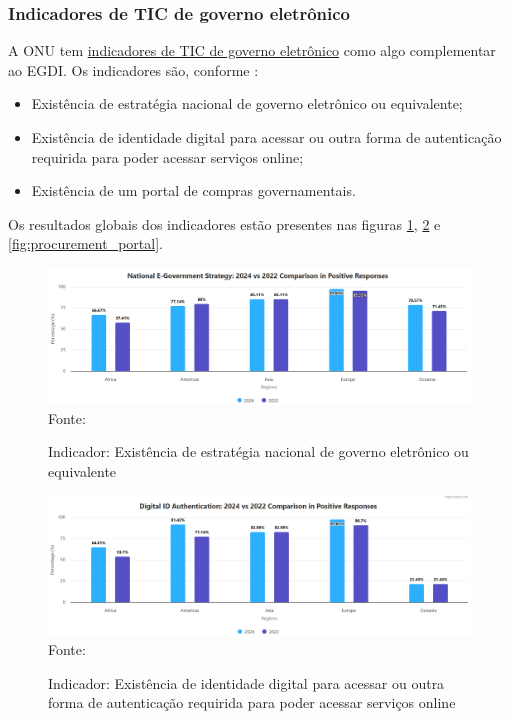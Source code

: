 \subsubsection{Indicadores de TIC de governo eletrônico}

A ONU tem \href{https://publicadministration.un.org/egovkb/en-us/Data/ICT-in-government}{indicadores de TIC de governo eletrônico} como algo complementar ao EGDI. Os indicadores são, conforme \cite{ONU_ICT_in_government_indicators}:

\begin{itemize}
    \item Existência de estratégia nacional de governo eletrônico ou equivalente;
    \item Existência de identidade digital para acessar ou outra forma de autenticação requirida para poder acessar serviços online;
    \item Existência de um portal de compras governamentais.
\end{itemize}

Os resultados globais dos indicadores estão presentes nas figuras \ref{fig:national_government_strategy}, \ref{fig:national_identity} e \ref{fig:procurement_portal}.

\begin{figure}[H]
	\centering
	\caption{Indicador: Existência de estratégia nacional de governo eletrônico ou equivalente}
	\includegraphics[width=1\linewidth]{figuras/ict_in_government/national_government_strategy}
	\label{fig:national_government_strategy}
	\footnotesize{Fonte: \cite{ONU_ICT_in_government_indicators}}
\end{figure}

\begin{figure}[H]
	\centering
	\caption{Indicador: Existência de identidade digital para acessar ou outra forma de autenticação requirida para poder acessar serviços online}
	\includegraphics[width=1\linewidth]{figuras/ict_in_government/digital_identity}
	\label{fig:national_identity}
	\footnotesize{Fonte: \cite{ONU_ICT_in_government_indicators}}
\end{figure}

